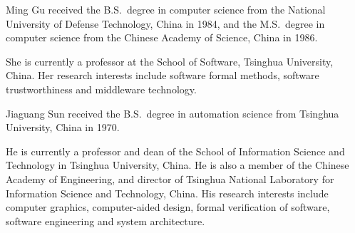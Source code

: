 \documentclass[12pt,onecolumn]{IEEEtranTIE}
\begin{document}
\begin{IEEEbiography}%
{Ming Gu} received the B.S.\ degree in computer science from the
National University of Defense Technology, China in 1984, and the
M.S.\ degree in computer science from the Chinese Academy of Science,
China in 1986.
 
She is currently a professor at the School of Software, Tsinghua
University, China.  Her research interests include software formal
methods, software trustworthiness and middleware technology.
\end{IEEEbiography}

\begin{IEEEbiography}%
{Jiaguang Sun} received the B.S.\ degree in automation science from
Tsinghua University, China in 1970.  

He is currently a professor and dean of the School of Information
Science and Technology in Tsinghua University, China. He is also a
member of the Chinese Academy of Engineering, and director of Tsinghua
National Laboratory for Information Science and Technology, China.
His research interests include computer graphics, computer-aided
design, formal verification of software, software engineering and
system architecture.
\end{IEEEbiography}
\end{document}
